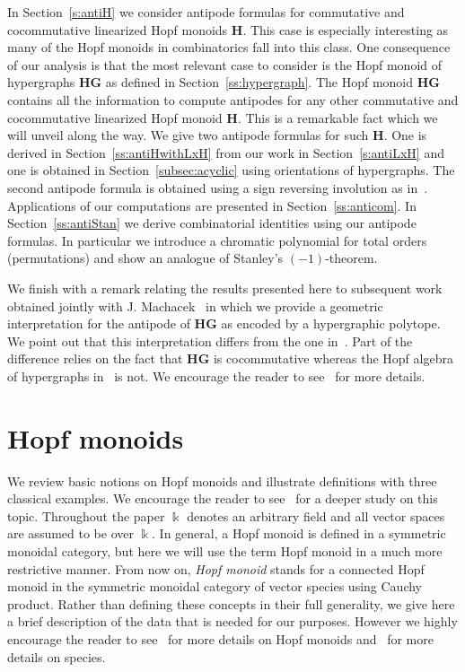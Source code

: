 \documentclass[ALCO,ThmDefs,Unicode,epreuves]{cedram}
\def\field{\Bbbk}
\newcommand{\bH}{\mathbf{H}}
\begin{document}
 
In Section~\ref{s:antiH} we consider antipode formulas for commutative and cocommutative linearized Hopf monoids $\bH$.
This case is especially interesting as many of the Hopf monoids in combinatorics fall into this class.
One consequence of our analysis is that the most relevant case to consider is the Hopf monoid of hypergraphs $\mathbf{HG}$ as defined in Section~\ref{ss:hypergraph}.
The Hopf monoid $\mathbf{HG}$ contains all the information to compute antipodes for any other commutative and cocommutative linearized Hopf monoid $\bH$.
This is a remarkable fact which we will unveil along the way.
We give two antipode formulas for such $\bH$. One is derived in Section~\ref{ss:antiHwithLxH} from our work in Section~\ref{s:antiLxH} and one is obtained in Section~\ref{subsec:acyclic} using orientations of hypergraphs. The second antipode formula is obtained using a sign reversing involution as in~\cite{Benedetti-Sagan,Bergeron-Ceballos}.
Applications of our computations are presented in Section~\ref{ss:anticom}.
In Section~\ref{ss:antiStan} we derive combinatorial identities using our antipode formulas.
In particular we introduce a chromatic polynomial for total orders (permutations) and show an analogue of Stanley's $(-1)$-theorem.

We finish with a remark relating the results presented here to subsequent work obtained jointly with J. Machacek~\cite{BBM:2017} in which we provide a geometric interpretation for the antipode of $\mathbf{HG}$ as encoded by a hypergraphic polytope. 
We point out that this interpretation differs from the one in~\cite{Aguiar-Ardila}. Part of the difference relies on the fact that $\mathbf{HG}$ is cocommutative whereas the Hopf algebra of hypergraphs in~\cite{Aguiar-Ardila} is not. We encourage the reader to see~\cite{BBM:2017} for more details.



\section{Hopf monoids}\label{s:hopf}


We review basic notions on Hopf monoids and illustrate definitions with three classical examples. We encourage the reader to see~\cite{AM:2010} for a deeper study on this topic. Throughout the paper $\field$ denotes an arbitrary field and all vector spaces are assumed to be over $\field$. 
In general, a Hopf monoid is defined in a symmetric monoidal category, but here we will use the term {Hopf monoid} in a much more
restrictive manner. From now on, \emph{Hopf monoid} stands for a connected Hopf monoid in the symmetric monoidal category of vector species using Cauchy product. Rather than defining these concepts in their full generality, we give here a brief description of the data that is needed for our purposes. However we highly encourage the reader to see~\cite{AM:2010} for more details on Hopf monoids and~\cite{species98} for more details on species.
\end{document}
